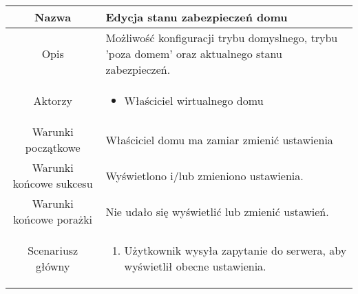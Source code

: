 \documentclass{article}
\begin{document}
\begin{enumerate}
\begin{enumerate}
				\begin{table}[H]
					\centering
					\begin{tabular}{|c|p{7cm}|}
						\hline
						Nazwa                   & Edycja stanu zabezpieczeń domu                                                                                                                                                                                                                                                                                                \\
						\hline
						Opis                    & Możliwość konfiguracji trybu domyslnego, trybu 'poza domem' oraz aktualnego stanu zabezpieczeń.                                                                                                                                                                                                                               \\
						\hline
						Aktorzy                 & \begin{itemize}\item Właściciel wirtualnego domu\end{itemize}                                                                                                                                                                                                                                                                 \\
						\hline
						Warunki początkowe      & Właściciel domu ma zamiar zmienić ustawienia                                                                                                                                                                                                                                                                                  \\
						\hline
						Warunki końcowe sukcesu & Wyświetlono i/lub zmieniono ustawienia.                                                                                                                                                                                                                                                                                       \\
						\hline
						Warunki końcowe porażki & Nie udało się wyświetlić lub zmienić ustawień.                                                                                                                                                                                                                                                                                \\
						\hline
						Scenariusz główny       & \begin{enumerate}\item Użytkownik wysyła zapytanie do serwera, aby wyświetlił obecne ustawienia.


\end{enumerate}
\end{tabular}
\end{table}
\end{enumerate}
\end{enumerate}
\end{document}

